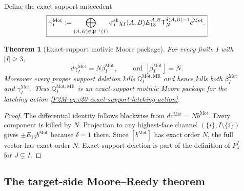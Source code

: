 \documentclass[11pt]{article}
\newtheorem{theorem}{Theorem}[section]
\theoremstyle{remark}
\newcommand{\Mot}{\mathrm{Mot}}
\newcommand{\MR}{\mathrm{MR}}
\newcommand{\ord}{\operatorname{ord}}
\begin{document}
Define the exact-support antecedent
\begin{equation}
 \boxed{
 \gamma_I^{\Mot}
 :=
 \bigoplus_{(A,B)\in\mathfrak P^\to(I)}
 \sigma_I^{\rm sh}\chi_I(A,B)
 E_{13}^{A,B}\mathsf T_N^{\delta(A,B)-1}c^{\Mot}.}
\end{equation}

\begin{theorem}[Exact-support motivic Moore package]
\label{P2M-thm:v20-exact-support-motivic-moore-package}
For every finite $I$ with $|I|\ge3$,
\begin{equation}
 \boxed{
 d\gamma_I^{\Mot}=N\beta_I^{\Mot},
 \qquad
 \ord[\beta_I^{\Mot}]=N.}
\end{equation}
Moreover every proper support deletion kills
$\mathbb Q_I^{\Mot,\MR}$ and hence kills both
$\beta_I^{\Mot}$ and $\gamma_I^{\Mot}$.
Thus $\mathbb Q_I^{\Mot,\MR}$ is an exact-support motivic Moore package for
the latching action \eqref{P2M-eq:v20-exact-support-latching-action}.
\end{theorem}

\begin{proof}
The differential identity follows blockwise from
$dc^{\Mot}=Nb^{\Mot}$.  Every component is killed by $N$.  Projection to any
highest-face channel
$(\{i\},I\setminus\{i\})$ gives
$\pm E_{13}b^{\Mot}$ because $\delta=1$ there.  Since
$[b^{\Mot}]$ has exact order $N$, the full vector has exact order $N$.
Exact-support deletion is part of the definition of
$P_J^I$ for $J\subsetneq I$.
\end{proof}

\subsection{The target-side Moore--Reedy theorem}
\end{document}
